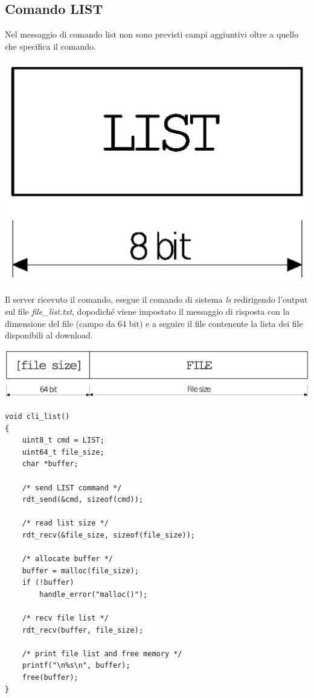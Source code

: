 \subsection{Comando LIST}

Nel messaggio di comando list non sono previsti campi aggiuntivi oltre a quello che specifica il comando.

\includegraphics[scale=0.35]{images/list_client}

Il server ricevuto il comando, esegue il comando di sistema \emph{ls} redirigendo l'output sul file \emph{file\_list.txt}, dopodiché viene impostato il messaggio di risposta con la dimensione del file (campo da 64 bit) e a seguire il file contenente la lista dei file disponibili al download.

\includegraphics[scale=0.35]{images/list_server}

\begin{lstlisting}[title=clicmd.c]
void cli_list()
{
    uint8_t cmd = LIST;
    uint64_t file_size;
    char *buffer;

    /* send LIST command */
    rdt_send(&cmd, sizeof(cmd));

    /* read list size */
    rdt_recv(&file_size, sizeof(file_size));

    /* allocate buffer */
    buffer = malloc(file_size);
    if (!buffer)
        handle_error("malloc()");

    /* recv file list */
    rdt_recv(buffer, file_size);

    /* print file list and free memory */
    printf("\n%s\n", buffer);
    free(buffer);
}                                                                
\end{lstlisting}

